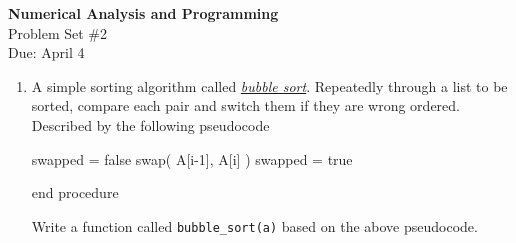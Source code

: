 \documentclass[12pt]{article}
\begin{document}
\begin{center}
\Large
\textbf{Numerical Analysis and Programming}\\
\large
Problem Set \#2\\
Due: April 4
\end{center}
\begin{enumerate}
\item
A simple sorting algorithm called \href{http://en.wikipedia.org/wiki/Bubble_sort}{\textit{bubble sort}}. Repeatedly through a list to be sorted, compare each pair and switch them if they are wrong ordered. Described by the following pseudocode

\begin{algorithmic}[1]
\Repeat
\State swapped = false
\State swap( A[i-1], A[i] )
\State swapped = true
\EndIf
\EndFor

end procedure
\EndFunction
%
% 
\end{algorithmic}
Write a function called \texttt{bubble\_sort(a)}  based on the above pseudocode. 


\end{enumerate}
\end{document}

